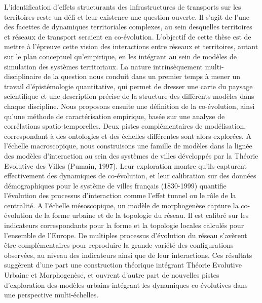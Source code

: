 L'identification d'effets structurants des infrastructures de transports sur les territoires reste un défi et leur existence une question ouverte. Il s'agit de l'une des facettes de dynamiques territoriales complexes, au sein desquelles territoires et réseaux de transport seraient en co-évolution. L'objectif de cette thèse est de mettre à l'épreuve cette vision des interactions entre réseaux et territoires, autant sur le plan conceptuel qu'empirique, en les intégrant au sein de modèles de simulation des systèmes territoriaux. La nature intrinsèquement multi-disciplinaire de la question nous conduit dans un premier temps à mener un travail d'épistémologie quantitative, qui permet de dresser une carte du paysage scientifique et une description précise de la structure des différents modèles dans chaque discipline. Nous proposons ensuite une définition de la co-évolution, ainsi qu'une méthode de caractérisation empirique, basée sur une analyse de corrélations spatio-temporelles. Deux pistes complémentaires de modélisation, correspondant à des ontologies et des échelles différentes sont alors explorées. A l'échelle macroscopique, nous construisons une famille de modèles dans la lignée des modèles d'interaction au sein des systèmes de villes développés par la Théorie Evolutive des Villes (Pumain, 1997). Leur exploration montre qu'ils capturent effectivement des dynamiques de co-évolution, et leur calibration sur des données démographiques pour le système de villes français (1830-1999) quantifie l'évolution des processus d'interaction comme l'effet tunnel ou le rôle de la centralité. A l'échelle mésoscopique, un modèle de morphogenèse capture la co-évolution de la forme urbaine et de la topologie du réseau. Il est calibré sur les indicateurs correspondants pour la forme et la topologie locales calculés pour l'ensemble de l'Europe. De multiples processus d'évolution du réseau s'avèrent être complémentaires pour reproduire la grande variété des configurations observées, au niveau des indicateurs ainsi que de leur interactions. Ces résultats suggèrent d'une part une construction théorique intégrant Théorie Evolutive Urbaine et Morphogenèse, et ouvrent d'autre part de nouvelles pistes d'exploration des modèles urbains intégrant les dynamiques co-évolutives dans une perspective multi-échelles.





\newpage


